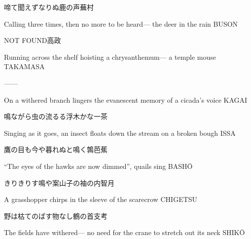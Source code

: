 \begin{haiku}
    {\FH {}啼て聞えずなりぬ鹿の声}\hfill{\FH 蕪村}

    \vin{} Calling three times,
    \vin{} \vin{} then no more to be heard---
    \vin{} \vin{} \vin{} the deer in the rain \hspace{\fill} BUSON
\end{haiku}

\begin{haiku}
    {NOT FOUND}\hfill{\FH 高政}

    \vin{} Running across the shelf
    \vin{} \vin{} hoisting a chrysanthemum---
    \vin{} \vin{} \vin{} a temple mouse \hspace{\fill} TAKAMASA
\end{haiku}

\begin{haiku}
   ---\hfill{---}

    \vin{} On a withered branch
    \vin{} \vin{} lingers the evanescent memory
    \vin{} \vin{} \vin{} of a cicada's voice \hspace{\fill} KAGAI
\end{haiku}

\begin{haiku}
    {\FH 鳴ながら虫の流るる浮木かな}\hfill{\FH 一茶}

    \vin{} Singing as it goes,
    \vin{} \vin{} an insect floats down the stream
    \vin{} \vin{} \vin{} on a broken bough \hspace{\fill} ISSA
\end{haiku}

\begin{haiku}
    {\FH 鷹の目も今や暮れぬと鳴く鶉}\hfill{\FH 芭蕉}

    \vin{} ``The eyes of the hawks
    \vin{} \vin{} are now dimmed'',
    \vin{} \vin{} \vin{} quails sing \hspace{\fill} BASH\={O}
\end{haiku}

\begin{haiku}
    {\FH きりきりす鳴や案山子の袖の内}\hfill{\FH 智月}

    \vin{} A grasshopper
    \vin{} \vin{} chirps in the sleeve
    \vin{} \vin{} \vin{} of the scarecrow \hspace{\fill} CHIGETSU
\end{haiku}

\begin{haiku}
    {\FH 野は枯てのばす物なし鶴の首}\hfill{\FH 支考}

    \vin{} The fields have withered---
    \vin{} \vin{} no need for the crane
    \vin{} \vin{} \vin{} to stretch out its neck \hspace{\fill} SHIK\={O}
\end{haiku}

